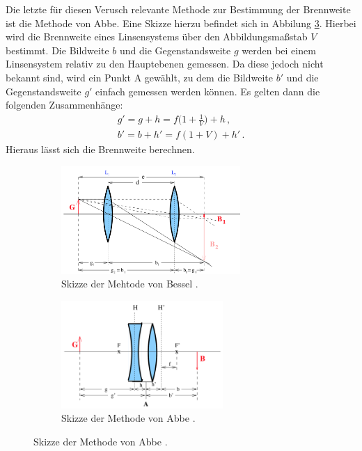 Die letzte für diesen Verusch relevante Methode zur Bestimmung der Brennweite ist
die Methode von Abbe. Eine Skizze hierzu befindet sich in Abbilung \ref{fig:abbe}.
Hierbei wird die Brennweite eines Linsensystems über den Abbildungsmaßstab $V$ bestimmt.
Die Bildweite $b$ und die Gegenstandsweite $g$ werden bei einem Linsensystem relativ zu den
Hauptebenen gemessen. Da diese jedoch nicht bekannt sind, wird ein Punkt A gewählt, zu dem
die Bildweite $b'$ und die Gegenstandsweite $g'$ einfach gemessen werden können. Es
gelten dann die folgenden Zusammenhänge:
\begin{align}
  g'=g+h=f\biggl(1+\frac{1}{V}\biggr)+h \,,\\
  b'=b+h'=f(1+V)+h'\,.
\end{align}
Hieraus lässt sich die Brennweite berechnen.

\begin{figure}
  \centering
  \begin{subfigure}{0.48\textwidth}
    \includegraphics[height=4.1cm]{data/bessel.png}
    \caption{Skizze der Mehtode von Bessel \cite{Versuchsanleitung}.}
    \label{fig:bessel}
  \end{subfigure}
  \begin{subfigure}{0.48\textwidth}
    \centering
    \includegraphics[height=4.1cm]{data/abbe.png}
    \caption{Skizze der Methode von Abbe \cite{Versuchsanleitung}.}
    \label{fig:abbe}
  \end{subfigure}
\end{figure}
